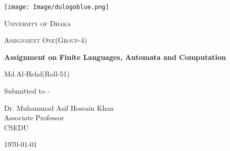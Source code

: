 \documentclass[12pt,a4paper]{report}
\begin{document}
\begin{titlepage}
\centering
\texttt{[image: Image/dulogoblue.png]}\\
{\scshape\LARGE University of Dhaka \par}
\vspace{1cm}
{\scshape\Large Assignment One(Group-4)\par}
\vspace{1.5cm}
{\huge\bfseries Assignment on Finite Languages, Automata and Computation\par}
\vspace{2cm}
{\Large Md.Al-Helal(Roll-51)\par}
\vfill
Submitted to -\par
Dr. Muhammad Asif Hossain Khan\\ Associate Professor\\CSEDU
\vfill
{\large \today\par}
\end{titlepage}
\end{document}
